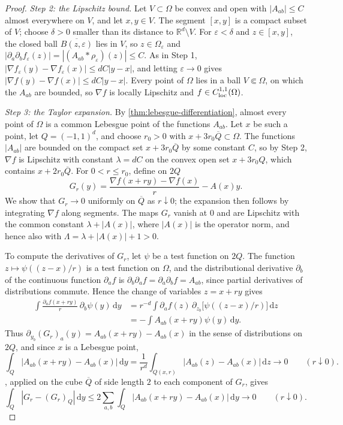 \begin{proof}
\emph{Step 2: the Lipschitz bound.} Let $V\subset\Omega$ be convex and open with $|A_{ab}|\leq C$ almost everywhere on $V$, and let $x,y\in V$. The segment $[x,y]$ is a compact subset of $V$; choose $\delta>0$ smaller than its distance to $\mathbb R^d\setminus V$. For $\varepsilon<\delta$ and $z\in[x,y]$, the closed ball $\overline{B(z,\varepsilon)}$ lies in $V$, so $z\in\Omega_\varepsilon$ and $|\partial_a\partial_bf_\varepsilon(z)|=|(A_{ab}*\rho_\varepsilon)(z)|\leq C$. As in Step 1, $|\nabla f_\varepsilon(y)-\nabla f_\varepsilon(x)|\leq dC|y-x|$, and letting $\varepsilon\to0$ gives $|\nabla f(y)-\nabla f(x)|\leq dC|y-x|$. Every point of $\Omega$ lies in a ball $V\Subset\Omega$, on which the $A_{ab}$ are bounded, so $\nabla f$ is locally Lipschitz and $f\in C^{1,1}_{\mathrm{loc}}(\Omega)$.

\emph{Step 3: the Taylor expansion.} By \cref{thm:lebesgue-differentiation}, almost every point of $\Omega$ is a common Lebesgue point of the functions $A_{ab}$. Let $x$ be such a point, let $Q=(-1,1)^d$, and choose $r_0>0$ with $x+3r_0\overline Q\subset\Omega$. The functions $|A_{ab}|$ are bounded on the compact set $x+3r_0\overline Q$ by some constant $C$, so by Step 2, $\nabla f$ is Lipschitz with constant $\lambda=dC$ on the convex open set $x+3r_0Q$, which contains $x+2r_0\overline Q$. For $0<r\leq r_0$, define on $2Q$
\[
 G_r(y)=\frac{\nabla f(x+ry)-\nabla f(x)}r-A(x)y.
\]
We show that $G_r\to0$ uniformly on $\overline Q$ as $r\downarrow0$; the expansion then follows by integrating $\nabla f$ along segments. The maps $G_r$ vanish at $0$ and are Lipschitz with the common constant $\lambda+|A(x)|$, where $|A(x)|$ is the operator norm, and hence also with $\Lambda=\lambda+|A(x)|+1>0$.

To compute the derivatives of $G_r$, let $\psi$ be a test function on $2Q$. The function $z\mapsto\psi((z-x)/r)$ is a test function on $\Omega$, and the distributional derivative $\partial_b$ of the continuous function $\partial_af$ is $\partial_b\partial_af=\partial_a\partial_bf=A_{ab}$, since partial derivatives of distributions commute. Hence the change of variables $z=x+ry$ gives
\[
\begin{split}
 \int\frac{\partial_af(x+ry)}r\,\partial_b\psi(y)\,\mathrm dy&=r^{-d}\int\partial_af(z)\,\partial_{z_b}\bigl[\psi((z-x)/r)\bigr]\,\mathrm dz\\
 &=-\int A_{ab}(x+ry)\psi(y)\,\mathrm dy.
\end{split}
\]
Thus $\partial_{y_b}(G_r)_a(y)=A_{ab}(x+ry)-A_{ab}(x)$ in the sense of distributions on $2Q$, and since $x$ is a Lebesgue point,
\[
 \int_Q|A_{ab}(x+ry)-A_{ab}(x)|\,\mathrm dy=\frac1{r^d}\int_{Q(x,r)}|A_{ab}(z)-A_{ab}(x)|\,\mathrm dz\to0\qquad(r\downarrow0).
\]
, applied on the cube $\overline Q$ of side length $2$ to each component of $G_r$, gives
\[
 \int_Q|G_r-(G_r)_Q|\,\mathrm dy\leq2\sum_{a,b}\int_Q|A_{ab}(x+ry)-A_{ab}(x)|\,\mathrm dy\to0\qquad(r\downarrow0).
\]


\end{proof}
